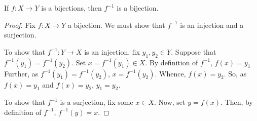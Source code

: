 \guard




\begin{prop}
\label{prop:inverseOfBijectionIsBijection}
  If $f:X\to Y$ is a bijections, then $f^{-1}$ is a bijection.
\end{prop}
\begin{proof}
  Fix $f:X\to Y$ a bijection.
  We must show that $f^{-1}$ is an injection and a surjection.

  To show that $f^{-1}:Y\to X$ is an injection, fix $y_1,y_2\in Y$.
  Suppose that $f^{-1}(y_1)=f^{-1}(y_2)$.
  Set $x = f^{-1}(y_1)\in X$.
  By definition of $f^{-1}$, $f(x)=y_1$
  Further, as $f^{-1}(y_1)=f^{-1}(y_2)$, $x = f^{-1}(y_2)$.
  Whence, $f(x)=y_2$.
  So, as $f(x)=y_1$ and $f(x)=y_2$, $y_1=y_2$.

  To show that $f^{-1}$ is a surjection, fix some $x\in X$.
  Now, set $y=f(x)$.
  Then, by definition of $f^{-1}$, $f^{-1}(y)=x$.
\end{proof}
